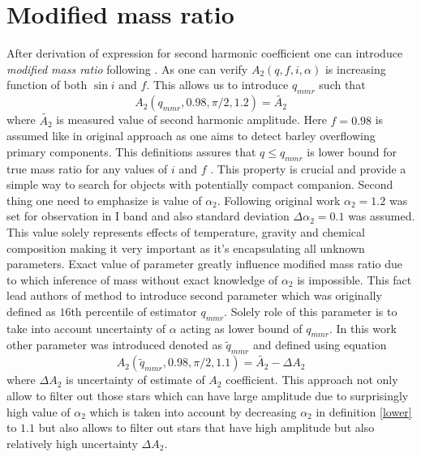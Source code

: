 \documentclass{pracalicmgr}
\begin{document}
\section{Modified mass ratio}
\hspace{1cm} After derivation of expression for second harmonic coefficient one can introduce {\it modified mass ratio} following \citep{gomel_search_2021-1}. 
As one can verify $A_2(q,f,i,\alpha)$ is increasing 
function of both $\sin{i}$ and $f$. This allows us to introduce $q_{mmr}$ such that
\begin{equation}\label{qmmr}
    A_2(q_{mmr},0.98,\pi/2,1.2)=\tilde{A_2}
\end{equation}
where $\tilde{A_2}$ is measured value of second harmonic amplitude.
Here $f=0.98$ is assumed like in original approach as one aims to detect barley overflowing primary components.
This definitions assures that $q\leq q_{mmr}$ is lower bound for true mass ratio for any values of $i$ and $f$  . 
This property is crucial and provide a simple way to search for objects with potentially compact companion. Second thing 
one need to emphasize is value of $\alpha_2$. Following original work $\alpha_2=1.2$ was set for observation in I band and also standard deviation $\Delta\alpha_2=0.1$
was assumed. This value
solely represents effects of temperature, gravity and chemical composition making it very important as it's encapsulating all unknown parameters. 
Exact value of parameter greatly influence modified mass ratio due to which inference of mass without exact knowledge of $\alpha_2$ is impossible.
This fact lead authors of method to introduce second parameter which was originally defined as $16$th percentile of estimator $q_{mmr}$. Solely role of this 
parameter is to take into account uncertainty of $\alpha$ acting as lower bound of $q_{mmr}$. In this work other parameter was introduced denoted as $\tilde{q}_{mmr}$ and defined 
using equation
\begin{equation*}\label{lower}
    A_2(\tilde{q}_{mmr},0.98,\pi/2,1.1)=\tilde{A_2}-\Delta A_2
\end{equation*}
where $\Delta A_2$ is uncertainty of estimate of $A_2$ coefficient. This approach not only allow to filter out those stars which can have large amplitude due to 
surprisingly high value of $\alpha_2$ which is taken into account by decreasing $\alpha_2$ in definition \ref{lower} to $1.1$ but also allows to filter out stars
that have high amplitude but also relatively high uncertainty $\Delta A_2$.
\end{document}
